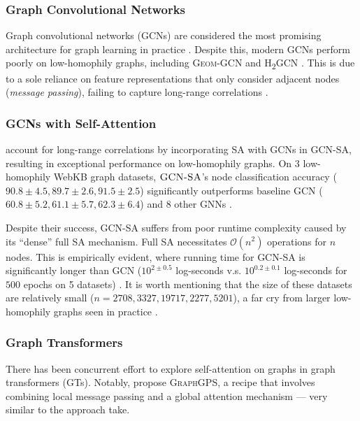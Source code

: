 \subsubsection{Graph Convolutional Networks}

Graph convolutional networks (GCNs)
are considered the most promising
architecture for graph learning in practice
\citep{hamilton2017representation}.
Despite this,
modern GCNs perform poorly on low-homophily graphs,
including \textsc{Geom-GCN} \citep{pei2020geom}
and \textsc{H\textsubscript{2}GCN} \citep{zhu2020beyond}.
This is due to a sole reliance on
feature representations that only consider
adjacent nodes (\emph{message passing}),
failing to capture long-range correlations \citep{jiang2024self}.

\subsubsection{GCNs with Self-Attention}

\citet{jiang2024self} account for long-range correlations
by incorporating SA with GCNs in \textsc{GCN-SA},
resulting in exceptional performance on low-homophily graphs.
On 3 low-homophily WebKB graph datasets,
$ \textsc{GCN-SA} $'s node classification accuracy
($90.8\pm4.5, 89.7\pm2.6, 91.5\pm2.5$)
significantly outperforms baseline GCN
($60.8\pm5.2, 61.1\pm5.7, 62.3\pm6.4$)
and $ 8 $ other GNNs \citep{jiang2024self}.

Despite their success,
\textsc{GCN-SA} suffers from poor runtime complexity
caused by its ``dense'' full SA mechanism.
Full SA necessitates $ \mathcal{O}(n^2) $ operations 
for $ n $ nodes.
This is empirically evident,
where running time for \textsc{GCN-SA} 
is significantly longer than \textsc{GCN}
($10^{2\pm 0.5}$ log-seconds 
v.s. $ 10^{0.2\pm 0.1} $ log-seconds
for $ 500 $ epochs on 5 datasets)
\citep{jiang2024self}.
It is worth mentioning that the size of these datasets
are relatively small ($n = 2708, 3327, 19717, 2277, 5201$), 
a far cry from larger 
low-homophily graphs seen in practice \citep{lim2021large}.

\subsubsection{Graph Transformers}

There has been concurrent effort to explore self-attention
on graphs in graph transformers (GTs).
Notably, \citet{rampavsek2022recipe}
propose \textsc{GraphGPS}, a recipe that
involves combining local message passing and a global attention 
mechanism --- very similar
to the approach \citet{jiang2024self} take.

